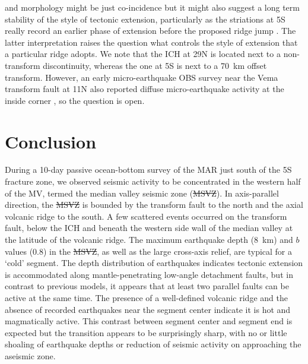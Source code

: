 \documentclass[jgr]{agu2001}
\newlength{\tw}
\providecommand{\DIFadd}[1]{{\protect\color{blue}\uwave{#1}}} %
\providecommand{\DIFdel}[1]{{\protect\color{red}\sout{#1}}}                      %
\providecommand{\DIFaddbegin}{} %
\providecommand{\DIFaddend}{} %
\providecommand{\DIFdelbegin}{} %
\providecommand{\DIFdelend}{} %
\begin{document}
\begin{article}
and morphology might  be just co-incidence but it might also
suggest a long term stability of the style of tectonic extension,
particularly as the striations at 5\dg S really record an earlier
phase of extension before the proposed ridge jump
\citep{reston02}. The latter interpretation  raises  the question what
controls the style of extension that a particular ridge adopts.   We
note that the
ICH at 29\dg N is located next to a non-transform discontinuity,
whereas the one at 5\dg S is next to a 70~km offset transform. However,
an early micro-earthquake OBS survey near the Vema transform fault at
11\dg N also reported diffuse micro-earthquake activity at the inside
corner \citep{rowlett84}, so the question is open.  

\section{Conclusion}

During a 10-day passive ocean-bottom survey of the  MAR just south
of the 5\dg S fracture zone, we observed seismic activity to be
concentrated in the western half of the MV, termed the median valley
seismic zone (\DIFdelbegin \DIFdel{MSVZ}\DIFdelend \DIFaddbegin \DIFadd{MVSZ}\DIFaddend ). In axis-parallel direction, the \DIFdelbegin \DIFdel{MSVZ }\DIFdelend \DIFaddbegin \DIFadd{MVSZ }\DIFaddend is bounded
by the transform fault to the north and the axial
volcanic ridge to the south.  A few scattered events occurred on the transform
fault, below the ICH and beneath the western side wall of the median
valley at the latitude of the volcanic ridge. The maximum earthquake
depth (8~km) and $b$ values (0.8) in the \DIFdelbegin \DIFdel{MSVZ}\DIFdelend \DIFaddbegin \DIFadd{MVSZ}\DIFaddend , as well as the large
cross-axis relief, are typical for a `cold' segment.  The depth
distribution of earthquakes indicates tectonic extension is
accommodated along mantle-penetrating low-angle detachment faults, but in contrast to
previous models, it appears that at least two parallel faults can be
active at the same time.  The presence of a well-defined volcanic
ridge and the absence of recorded earthquakes near the segment center
indicate it is hot and magmatically active.  This contrast between
segment center and segment end is expected but the transition appears
to be surprisingly sharp, with no or little shoaling of earthquake
depths or reduction of seismic activity on approaching the aseismic
zone. 


\end{article}
\end{document}
